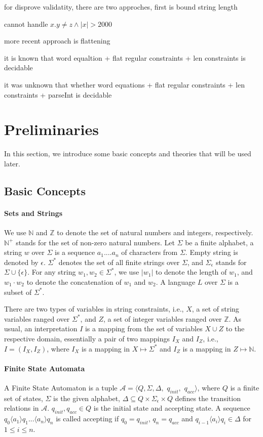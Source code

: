 \documentclass[runningheads]{llncs}
\begin{document}
for disprove validatity, there are two approches, first is bound string length

cannot handle $x.y \neq z  \wedge |x| > 2000$

more recent approach is flattening

it is known that word equaltion + flat regular constraints + len constraints
is decidable

it was unknown that whether word equations + flat regular constraints + len constraints + parseInt is decidable



\section{Preliminaries} \label{sec:pre}

In this section, we introduce some basic concepts and theories that will be used later. 
\subsection{Basic Concepts}

\paragraph{Sets and Strings}
We use $\mathbb{N}$ and $\mathbb{Z}$ to denote the set of natural numbers and integers, respectively. 
$\mathbb{N}^+$ stands for the set of non-zero natural numbers. 
Let $\Sigma$ be a finite alphabet,
a string $w$ over $\Sigma$ is a sequence $a_1....a_n$ of characters from $\Sigma$.
Empty string is denoted by $\epsilon$.
$\Sigma^*$ denotes the set of all finite strings over $\Sigma$,
and $\Sigma_{\epsilon}$ stands for $\Sigma \cup \{\epsilon\}$.
For any string $w_1, w_2\in \Sigma^*$, 
we use $|w_1|$ to denote the length of $w_1$,
and $w_1\cdot w_2$ to denote the concatenation of $w_1$ and $w_2$.
A language $L$ over $\Sigma$ is a subset of $\Sigma^*$.

There are two types of variables in string constraints,
i.e., $X$, a set of string variables ranged over $\Sigma^*$,  
and $Z$,  a set of integer variables ranged over $\mathbb{Z}$.
As usual, an interpretation $I$ is a mapping from the set of variables $X\cup Z$ to the respective domain, 
essentially a pair of two mappings 
$I_X$ and $I_Z$, i.e., $I= (I_X, I_Z)$,  
where $I_X$ is a mapping in $X \mapsto \Sigma^*$ and $I_Z$ is a mapping in $Z \mapsto \mathbb{N}$.

\paragraph{Finite State Automata}
A Finite State Automaton is a tuple 
$\mathcal{A}=\langle Q,\Sigma,\Delta,$ $q_{\textit{init}},$ $q_{\textit{acc}}\rangle$, 
where $Q$ is a finite set of states, 
$\Sigma$ is the given alphabet,
$\Delta\subseteq Q\times \Sigma_\epsilon\times Q$ 
defines the transition relations in $\mathcal{A}$.
$q_{\textit{init}},q_{\textit{acc}}\in Q$ is the initial state and accepting state. 
A sequence $q_0 \langle a_1 \rangle  q_1 ... \langle a_n\rangle q_n$ is called accepting if $q_0 = q_{\textit{init}}$, $q_n = q_{\textit{acc}}$ and $q_{i-1}\langle a_i \rangle q_i \in \Delta$ for $1\le i\le n$.
\end{document}
